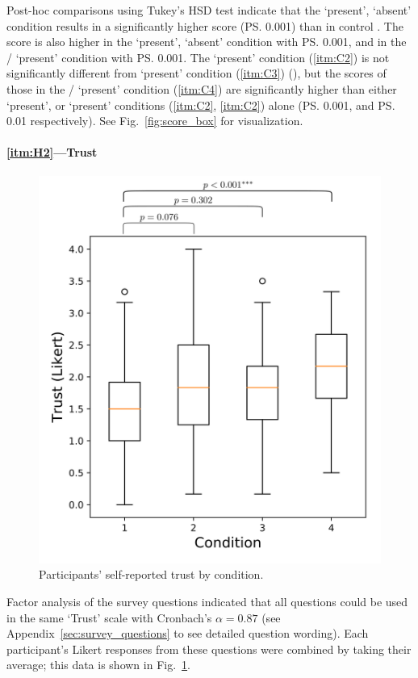 Post-hoc comparisons using Tukey's HSD test indicate that the \xQ{} `present', \xO{} `absent' condition  results in a significantly higher score (\ps{0.001}) than in control . The score is also higher  in the \xO{} `present', \xQ{} `absent' condition  with \ps{0.001}, and in the \xQ/\xO{} `present' condition  with \ps{0.001}. The \xQ{} `present' condition (\ref{itm:C2}) is not significantly different from \xO{} `present' condition (\ref{itm:C3}) (\pns), but the scores of those in the \xQ/\xO{} `present' condition (\ref{itm:C4}) are significantly higher than either \xQ{} `present', or \xO{} `present' conditions (\ref{itm:C2}, \ref{itm:C2}) alone (\ps{0.001}, and \ps{0.01} respectively). See Fig.~\ref{fig:score_box} for visualization.

\paragraph{\ref{itm:H2}---Trust}
       \begin{figure}[tb]
            \centering
            \includegraphics[width=0.7\linewidth]{Figures/trust_box.png}
            \caption{Participants' self-reported trust by condition.}
            \label{fig:trust_box}
       \end{figure}
Factor analysis of the survey questions indicated that all questions could be used in the same `Trust' scale with Cronbach's $\alpha = 0.87$ (see Appendix~\ref{sec:survey_questions} to see detailed question wording). Each participant's Likert responses from these questions were combined by taking their average; this data is shown in Fig.~\ref{fig:trust_box}.

